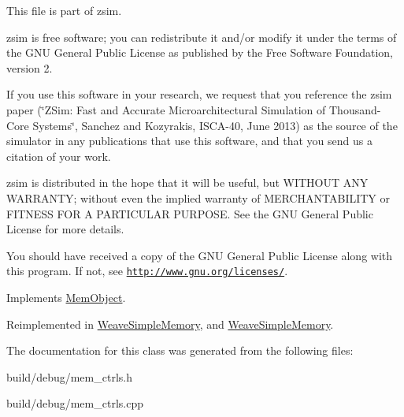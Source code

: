 This file is part of zsim.

zsim is free software; you can redistribute it and/or modify it under the terms of the G\-N\-U General Public License as published by the Free Software Foundation, version 2.

If you use this software in your research, we request that you reference the zsim paper (\char`\"{}\-Z\-Sim\-: Fast and Accurate Microarchitectural Simulation of
\-Thousand-\/\-Core Systems\char`\"{}, Sanchez and Kozyrakis, I\-S\-C\-A-\/40, June 2013) as the source of the simulator in any publications that use this software, and that you send us a citation of your work.

zsim is distributed in the hope that it will be useful, but W\-I\-T\-H\-O\-U\-T A\-N\-Y W\-A\-R\-R\-A\-N\-T\-Y; without even the implied warranty of M\-E\-R\-C\-H\-A\-N\-T\-A\-B\-I\-L\-I\-T\-Y or F\-I\-T\-N\-E\-S\-S F\-O\-R A P\-A\-R\-T\-I\-C\-U\-L\-A\-R P\-U\-R\-P\-O\-S\-E. See the G\-N\-U General Public License for more details.

You should have received a copy of the G\-N\-U General Public License along with this program. If not, see \href{http://www.gnu.org/licenses/}{\tt http\-://www.\-gnu.\-org/licenses/}. 

Implements \hyperlink{classMemObject}{Mem\-Object}.



Reimplemented in \hyperlink{classWeaveSimpleMemory_a0d141c7a3424ded10f053c3cd7b72368}{Weave\-Simple\-Memory}, and \hyperlink{classWeaveSimpleMemory_a0d141c7a3424ded10f053c3cd7b72368}{Weave\-Simple\-Memory}.



The documentation for this class was generated from the following files\-:\begin{DoxyCompactItemize}
\item 
build/debug/mem\-\_\-ctrls.\-h\item 
build/debug/mem\-\_\-ctrls.\-cpp\end{DoxyCompactItemize}

